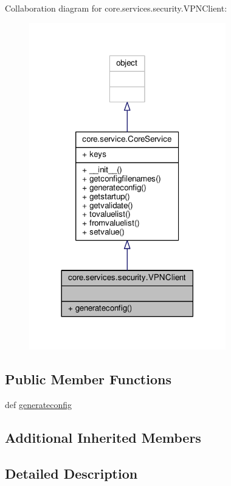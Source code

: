 Collaboration diagram for core.\+services.\+security.\+V\+P\+N\+Client\+:
\nopagebreak
\begin{figure}[H]
\begin{center}
\leavevmode
\includegraphics[width=242pt]{classcore_1_1services_1_1security_1_1_v_p_n_client__coll__graph}
\end{center}
\end{figure}
\subsection*{Public Member Functions}
\begin{DoxyCompactItemize}
\item 
def \hyperlink{classcore_1_1services_1_1security_1_1_v_p_n_client_a08bf61560277dd16f583c1b1b9d4e566}{generateconfig}
\end{DoxyCompactItemize}
\subsection*{Additional Inherited Members}


\subsection{Detailed Description}
\begin{DoxyVerb}\end{DoxyVerb}
 

